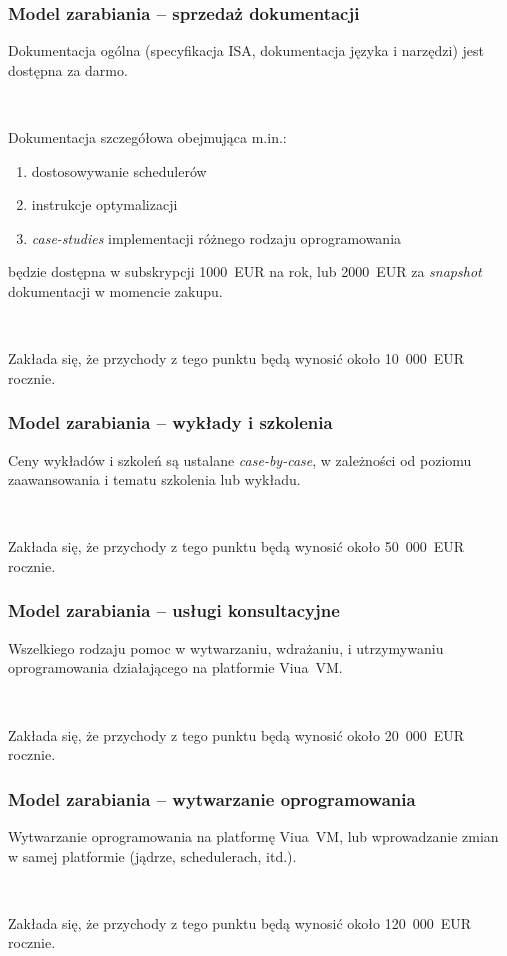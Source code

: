 \documentclass{beamer}
\begin{document}
\begin{frame}
    \frametitle{Model zarabiania -- sprzedaż dokumentacji}

    Dokumentacja ogólna (specyfikacja ISA, dokumentacja języka i narzędzi) jest
    dostępna za darmo.

    ~

    Dokumentacja szczegółowa obejmująca m.in.:

    \begin{enumerate}
        \item dostosowywanie schedulerów
        \item instrukcje optymalizacji
        \item \emph{case-studies} implementacji różnego rodzaju oprogramowania
    \end{enumerate}

    będzie dostępna w subskrypcji 1000~EUR na rok, lub 2000~EUR za
    \emph{snapshot} dokumentacji w momencie zakupu.

    ~

    Zakłada się, że przychody z tego punktu będą wynosić około 10~000~EUR rocznie.
\end{frame}

\begin{frame}
    \frametitle{Model zarabiania -- wykłady i szkolenia}

    Ceny wykładów i szkoleń są ustalane \emph{case-by-case}, w zależności od
    poziomu zaawansowania i tematu szkolenia lub wykładu.

    ~

    Zakłada się, że przychody z tego punktu będą wynosić około 50~000~EUR rocznie.
\end{frame}

\begin{frame}
    \frametitle{Model zarabiania -- usługi konsultacyjne}

    Wszelkiego rodzaju pomoc w wytwarzaniu, wdrażaniu, i utrzymywaniu
    oprogramowania działającego na platformie Viua~VM.

    ~

    Zakłada się, że przychody z tego punktu będą wynosić około 20~000~EUR
    rocznie.
\end{frame}

\begin{frame}
    \frametitle{Model zarabiania -- wytwarzanie oprogramowania}

    Wytwarzanie oprogramowania na platformę Viua~VM, lub
    \newline
    wprowadzanie zmian w samej platformie (jądrze, schedulerach, itd.).

    ~

    Zakłada się, że przychody z tego punktu będą wynosić około 120~000~EUR
    rocznie.
\end{frame}
\end{document}
